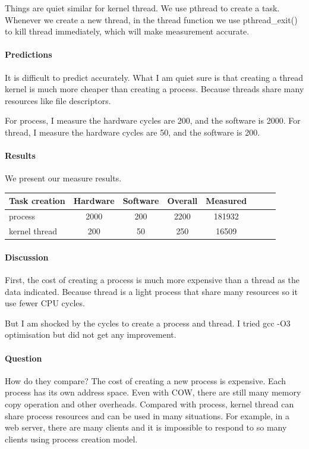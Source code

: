 Things are quiet similar for kernel thread. We use pthread to create a task. Whenever we create a new thread, in the thread function we use pthread\_exit() to kill thread immediately, which will make measurement accurate.

\paragraph{Predictions}
It is difficult to predict accurately. What I am quiet sure is that creating a thread kernel is much more cheaper than creating a process. Because threads share many resources like file descriptors.

For process, I measure the hardware cycles are 200, and the software is 2000.
For thread, I measure the hardware cycles are 50, and the software is 200.

\paragraph{Results}
We present our measure results.

\begin{center}
\begin{tabular}{l*{6}{c}r}
Task creation              & Hardware  & Software  & Overall  & Measured   \\
\hline
process & 2000 & 200 & 2200 & 181932  \\
kernel thread    & 200 & 50 & 250 & 16509 \\
\end{tabular}
\end{center}

\paragraph{Discussion}
First, the cost of creating a process is much more expensive than a thread as the data indicated. Because thread is a light process that share many resources so it use fewer CPU cycles.

But I am shocked by the cycles to create a process and thread. I tried gcc -O3 optimisation but did not get any improvement.

\paragraph{Question} How do they compare?
The cost of creating a new process is expensive. Each process has its own address space. Even with COW, there are still many memory copy operation and other overheads. Compared with process, kernel thread can share process resources and can be used in many situations. For example, in a web server, there are many clients and it is impossible to respond to so many clients using process creation model.

